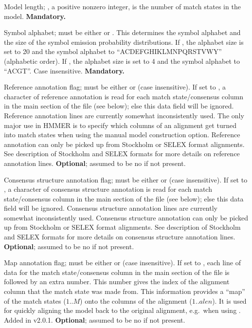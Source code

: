 \begin{wideitem}
\item [\emprog{LENG  <d>}] Model length; , a positive nonzero integer, 
is the number of match states in the model.
\textbf{Mandatory.}

\item [\emprog{ALPH  <s>}] Symbol alphabet;  must be either
 or . This determines the symbol alphabet and the
size of the symbol emission probability distributions.  If
, the alphabet size is set to 20 and the symbol alphabet
to ``ACDEFGHIKLMNPQRSTVWY'' (alphabetic order). If , the
alphabet size is set to 4 and the symbol alphabet to ``ACGT''.  Case
insensitive. \textbf{Mandatory.}

\item [\emprog{RF <s>}] Reference annotation flag;  must be
either  or  (case insensitive). If set to
, a character of reference annotation is read for each match
state/consensus column in the main section of the file (see below);
else this data field will be ignored.  Reference annotation lines are
currently somewhat inconsistently used. The only major use in HMMER is
to specify which columns of an alignment get turned into match states
when using the  manual model construction
option. Reference annotation can only be picked up from Stockholm or
SELEX format alignments. See description of Stockholm and SELEX formats
for more details on reference annotation lines. \textbf{Optional};
assumed to be no if not present.

\item [\emprog{CS <s>}] Consensus structure annotation flag;
 must be either  or  (case
insensitive). If set to , a character of consensus structure
annotation is read for each match state/consensus column in the main
section of the file (see below); else this data field will be
ignored. Consensus structure annotation lines are currently somewhat
inconsistently used.  Consensus structure annotation can only be
picked up from Stockholm or SELEX format alignments.  See description
of Stockholm and SELEX formats for more details on consensus structure
annotation lines. \textbf{Optional}; assumed to be no if not present.

\item [\emprog{MAP   <s>}] Map annotation flag;
 must be either  or  (case insensitive).
If set to , each line of data for the match state/consensus
column in the main section of the file is followed by an extra number.
This number gives the index of the alignment column that the match
state was made from. This information provides a ``map'' of the match
states ($1..M$) onto the columns of the alignment ($1..alen$).  It is
used for quickly aligning the model back to the original alignment,
e.g.\ when using . Added in v2.0.1.
\textbf{Optional}; assumed to be no if not present.


\end{wideitem}
